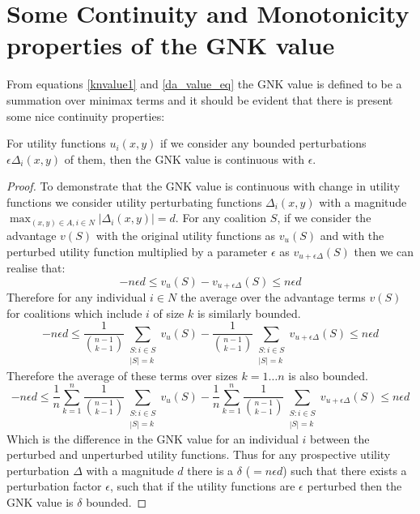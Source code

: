 
\appendix

\section{Some Continuity and Monotonicity properties of the GNK value}

From equations \ref{knvalue1} and \ref{da_value_eq} the GNK value is defined to be a summation over minimax terms and it should be evident that there is present some nice continuity properties:

\begin{theorem}
For utility functions $u_i(x,y)$ if we consider any bounded perturbations $\epsilon \Delta_i(x,y)$ of them, then the GNK value is continuous with $\epsilon$.
\end{theorem}
\begin{proof}
To demonstrate that the GNK value is continuous with change in utility functions we consider utility perturbating functions $\Delta_i(x,y)$ with a magnitude $\max_{(x,y)\in A, i\in N}|\Delta_i(x,y)| = d$.
For any coalition $S$, if we consider the advantage $v(S)$ with the original utility functions as $v_u(S)$ and with the perturbed utility function multiplied by a parameter $\epsilon$ as $v_{u+\epsilon \Delta}(S)$ then we can realise that:
$$-n\epsilon d \le v_u(S)-v_{u+\epsilon \Delta}(S) \le n\epsilon d$$
Therefore for any individual $i\in N$ the average over the advantage terms $v(S)$ for coalitions which include $i$ of size $k$ is similarly bounded.
$$-n\epsilon d \le \frac{1}{\binom{n-1}{k-1}} \sum_{\substack{S:i\in S \\ |S|=k}}v_u(S)-\frac{1}{\binom{n-1}{k-1}} \sum_{\substack{S:i\in S \\ |S|=k}}v_{u+\epsilon \Delta}(S) \le n\epsilon d$$
Therefore the average of these terms over sizes $k=1\dots n$ is also bounded.
$$-n\epsilon d \le \frac{1}{n}\sum_{k=1}^n \frac{1}{\binom{n-1}{k-1}} \sum_{\substack{S:i\in S \\ |S|=k}}v_u(S)-\frac{1}{n}\sum_{k=1}^n \frac{1}{\binom{n-1}{k-1}} \sum_{\substack{S:i\in S \\ |S|=k}}v_{u+\epsilon \Delta}(S) \le n\epsilon d$$
Which is the difference in the GNK value for an individual $i$ between the perturbed and unperturbed utility functions.
Thus for any prospective utility perturbation $\Delta$ with a magnitude $d$ there is a $\delta$ ($=n\epsilon d$) such that there exists a perturbation factor $\epsilon$, such that if the utility functions are $\epsilon$ perturbed then the GNK value is $\delta$ bounded.
\end{proof}

